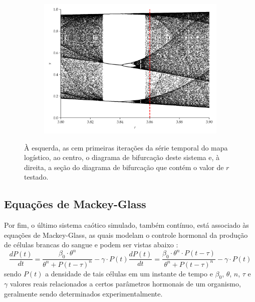 \documentclass[a4paper, 12pt]{article}
\begin{document}
\begin{figure}[H]
     \begin{subfigure}[t]{0.32\textwidth} 
         \includegraphics[scale=0.32]{mapa-logistico-zoom.png}
     \end{subfigure}
     \caption{À esquerda, as cem primeiras iterações da série temporal do mapa logístico, ao centro, o diagrama de bifurcação deste sistema e, à direita, a seção do diagrama de bifurcação que contém o valor de $r$ testado.}
     \label{fig:logistic}
\end{figure}

\subsection{Equações de Mackey-Glass}

Por fim, o último sistema caótico simulado, também contínuo, está associado às equações de Mackey-Glass, as quais modelam o controle hormonal da produção de células brancas do sangue e podem ser vistas abaixo \cite{mackey1977oscillation}:
\begin{subequations}
\begin{equation}
\frac{dP(t)}{dt} = \frac{\beta_0\cdot \theta^n}{\theta^n + P(t - \tau)^n} - \gamma\cdot P(t)
\end{equation}
\begin{equation}\label{eq:mackey-glass-chaos}
\frac{dP(t)}{dt} = \frac{\beta_0\cdot \theta^n \cdot P(t - \tau)}{\theta^n + P(t - \tau)^n} - \gamma\cdot P(t)
\end{equation}
\end{subequations}
sendo $P(t)$ a densidade de tais células em um instante de tempo e $\beta_0$, $\theta$, $n$, $\tau$ e $\gamma$ valores reais relacionados a certos parâmetros hormonais de um organismo, geralmente sendo determinados experimentalmente.
\end{document}
